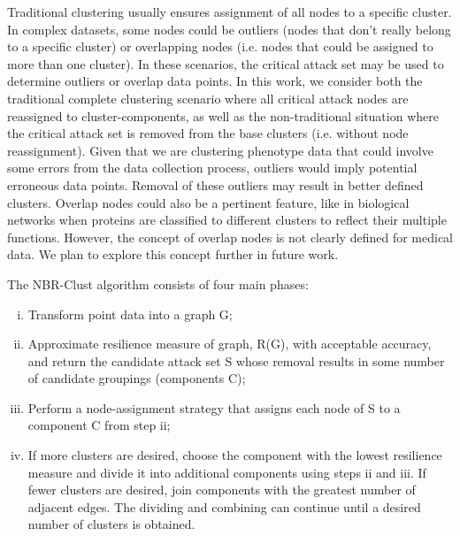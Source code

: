 \documentclass{bmcart}
\begin{document}
Traditional clustering usually ensures assignment of all nodes to a specific cluster.
In complex datasets, some nodes could be outliers (nodes that don't really belong to a specific cluster) or overlapping nodes (i.e. nodes that could be assigned to more than one cluster). In these scenarios, the critical attack set may be used to determine outliers or overlap data points\cite{ICDM,FLAIRS}. 
In this work, we consider both the traditional complete clustering scenario where all critical attack nodes are reassigned to cluster-components, as well as the non-traditional situation where the critical attack set is removed from the base clusters (i.e. without node reassignment). Given that we are clustering phenotype data that could involve some errors from the data collection process, outliers would imply potential erroneous data points. Removal of these outliers may result in better defined clusters. 
Overlap nodes could also be a pertinent feature, like in biological networks when proteins are classified to different clusters to reflect their multiple functions. However, the concept of overlap nodes is not clearly defined for medical data. We plan to explore this concept further in future work.



The NBR-Clust algorithm consists of four main phases: 
\begin{enumerate}[i)]
\item Transform point data into a graph G;
\item Approximate resilience measure of graph,  R(G), with acceptable accuracy, and return the candidate attack set S whose removal results in some number of candidate groupings (components C);
\item Perform a node-assignment strategy that assigns each node of S to a component C from step ii;
\item If more clusters are desired, choose the component with the lowest resilience measure and divide it into additional components using steps ii and iii. If fewer clusters are desired, join components with the greatest number of adjacent edges. The dividing and combining can continue until a desired number of clusters is obtained.
\end{enumerate}   
 
\end{document}
